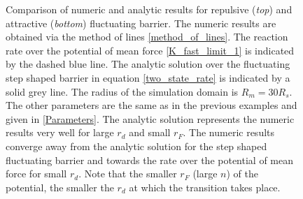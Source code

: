 \begin{minipage}[t]{.63 \textwidth}
\begin{figure}[H]
    \end{figure}
\end{minipage}
\begin{minipage}[t]{.37 \textwidth}
    \begin{figure}[H]
        \caption{Comparison of numeric and analytic results for repulsive (\emph{top}) and attractive (\emph{bottom}) fluctuating barrier. The numeric results are obtained via the method of lines \ref{method_of_lines}. The reaction rate over the potential of mean force \eqref{K_fast_limit_1} is indicated by the dashed blue line. The analytic solution over the fluctuating step shaped barrier in equation \eqref{two_state_rate} is indicated by a solid grey line. The radius of the simulation domain is $R_m=30 R_s$. The other parameters are the same as in the previous examples and given in \ref{Parameters}. The analytic solution represents the numeric results very well for large $r_d$ and small $r_F$. The numeric results converge away from the analytic solution for the step shaped fluctuating barrier and towards the rate over the potential of mean force for small $r_d$. Note that the smaller $r_F$ (large $n$) of the potential, the smaller the $r_d$ at which the transition takes place.\label{numeric}}
    \end{figure}
  \end{minipage}

